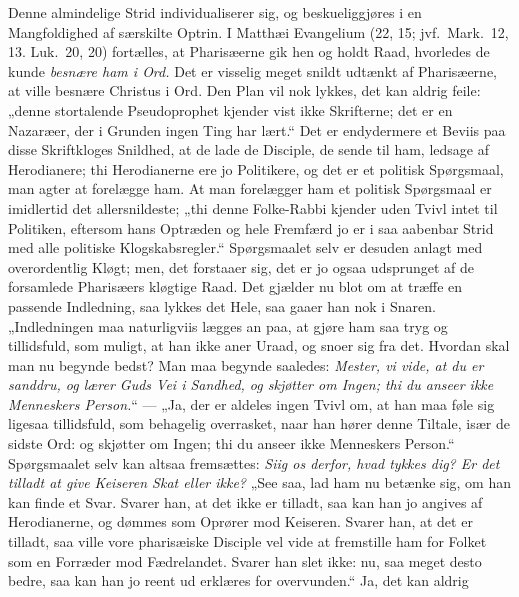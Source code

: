 \documentclass[12pt,a4paper]{book}
\begin{document}
Denne almindelige Strid individualiserer sig, og beskueliggjøres i en Mangfoldighed af
særskilte Optrin. I Matthæi Evangelium (22, 15; jvf.\ Mark.\ 12, 13. Luk.\ 20, 20)
fortælles, at Pharisæerne gik hen og holdt Raad, hvorledes de kunde \emph{besnære ham i
Ord.} Det er visselig meget snildt udtænkt af Pharisæerne, at ville besnære Christus i Ord.
Den Plan vil nok lykkes, det kan aldrig feile: „denne stortalende Pseudoprophet kjender
vist ikke Skrifterne; det er en Nazaræer, der i Grunden ingen Ting har lært.“ Det er
endydermere et Beviis paa disse Skriftkloges Snildhed, at de lade de Disciple, de sende til
ham, ledsage af Herodianere; thi Herodianerne ere jo Politikere, og
det er et politisk Spørgsmaal, man agter at forelægge ham. At man forelægger ham et politisk
Spørgsmaal er imidlertid det allersnildeste; „thi denne Folke-Rabbi kjender uden Tvivl
intet til Politiken, eftersom hans Optræden og hele Fremfærd jo er i saa aabenbar Strid med
alle politiske Klogskabsregler.“ Spørgsmaalet selv er desuden anlagt med overordentlig
Kløgt; men, det forstaaer sig, det er jo ogsaa udsprunget af de forsamlede Pharisæers
kløgtige Raad. Det gjælder nu blot om at træffe en passende Indledning, saa lykkes det
Hele, saa gaaer han nok i Snaren. „Indledningen maa naturligviis lægges an paa, at gjøre
ham saa tryg og tillidsfuld, som muligt, at han ikke aner Uraad, og snoer sig fra det.
Hvordan skal man nu begynde bedst? Man maa begynde saaledes: \emph{Mester, vi vide, at du
er sanddru, og lærer Guds Vei i Sandhed, og skjøtter om Ingen; thi du anseer ikke
Menneskers Person.}“ --- „Ja, der er aldeles ingen Tvivl om, at han maa føle sig ligesaa
tillidsfuld, som behagelig overrasket, naar han hører denne Tiltale, især de sidste Ord: og
skjøtter om Ingen; thi du anseer ikke Menneskers Person.“ Spørgsmaalet selv kan altsaa
fremsættes: \emph{Siig os derfor, hvad tykkes dig? Er det tilladt at give Keiseren Skat
eller ikke?} „See saa, lad ham nu betænke sig, om han kan finde et Svar. Svarer han, at det
ikke er tilladt, saa kan han jo angives af Herodianerne, og dømmes som Oprører mod
Keiseren. Svarer han, at det er tilladt, saa ville vore pharisæiske Disciple vel vide at
fremstille ham for Folket som en Forræder mod Fædrelandet. Svarer han slet ikke: nu, saa
meget desto bedre, saa kan han jo reent ud erklæres for overvunden.“ Ja, det kan aldrig
\end{document}
